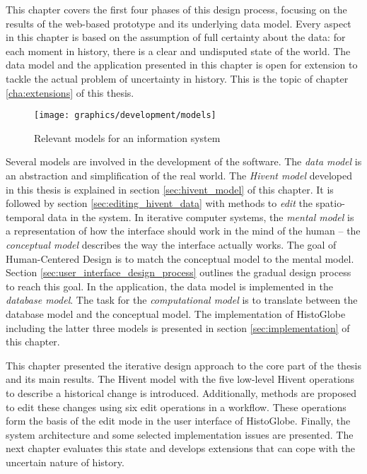 This chapter covers the first four phases of this design process, focusing on the results of the web-based prototype and its underlying data model. Every aspect in this chapter is based on the assumption of full certainty about the data: for each moment in history, there is a clear and undisputed state of the world. The data model and the application presented in this chapter is open for extension to tackle the actual problem of uncertainty in history. This is the topic of chapter \ref{cha:extensions} of this thesis.

\begin{figure}[H]
  \vspace{1.5em}
  \centering
  \texttt{[image: graphics/development/models]}
  \caption{Relevant models for an information system}
  \label{fig:models}
\end{figure}

Several models are involved in the development of the software. The \emph{data model} is an abstraction and simplification of the real world. The \emph{Hivent model} developed in this thesis is explained in section \ref{sec:hivent_model} of this chapter. It is followed by section \ref{sec:editing_hivent_data} with methods to \emph{edit} the spatio-temporal data in the system. In iterative computer systems, the \emph{mental model} is a representation of how  the interface should work in the mind of the human -- the \emph{conceptual model} describes the way the interface actually works. The goal of Human-Centered Design is to match the conceptual model to the mental model. Section \ref{sec:user_interface_design_process} outlines the gradual design process to reach this goal. In the application, the data model is implemented in the \emph{database model}. The task for the \emph{computational model} is to translate between the database model and the conceptual model. The implementation of HistoGlobe including the latter three models is presented in section \ref{sec:implementation} of this chapter.

\newpage







\vspace{2em}

This chapter presented the iterative design approach to the core part of the thesis and its main results. The Hivent model with the five low-level Hivent operations to describe a historical change is introduced. Additionally, methods are proposed to edit these changes using six edit operations in a workflow.
These operations form the basis of the edit mode in the user interface of HistoGlobe. Finally, the system architecture and some selected implementation issues are presented. The next chapter evaluates this state and develops extensions that can cope with the uncertain nature of history.
